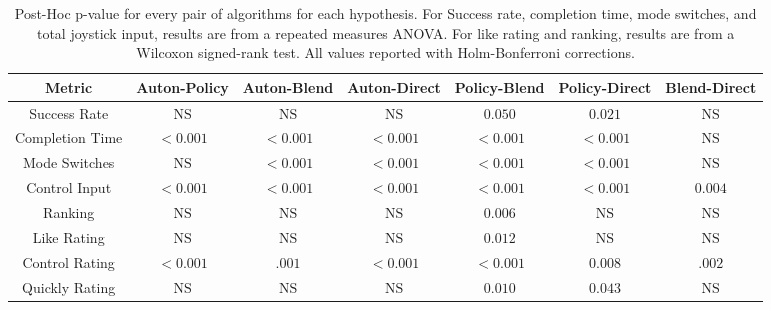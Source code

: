 \begin{table*}
  \newcommand{\algoauton}{Auton}
  \newcommand{\algopolicy}{Policy}
  \newcommand{\algoblend}{Blend}
  \newcommand{\algodirect}{Direct}
  \newcommand{\sigresult}[1]{\bm{#1}}
  \newcommand{\spssnoval}{\sigresult{<\!0.001}}
  \newcommand{\nonsigresult}{\text{NS}}
  \centering
  \begin{tabular}{|c|c|c|c|c|c|c|}
    \hline
    Metric & \algoauton-\algopolicy & \algoauton-\algoblend & \algoauton-\algodirect & \algopolicy-\algoblend & \algopolicy-\algodirect & \algoblend-\algodirect \\
    \hline
    Success Rate & $\nonsigresult$ & $\nonsigresult$ & $\nonsigresult$ & $\sigresult{0.050}$ & $\sigresult{0.021}$ & $\nonsigresult$ \\
    Completion Time & $\spssnoval$ & $\spssnoval$ & $\spssnoval$ & $\spssnoval$ & $\spssnoval$ & $\nonsigresult$ \\
    Mode Switches & $\nonsigresult$ & $\spssnoval$ & $\spssnoval$ & $\spssnoval$ & $\spssnoval$ & $\nonsigresult$ \\
    Control Input & $\spssnoval$ & $\spssnoval$ & $\spssnoval$ & $\spssnoval$ & $\spssnoval$ & $\sigresult{0.004}$ \\
    Ranking & $\nonsigresult$ & $\nonsigresult$ & $\nonsigresult$ & $\sigresult{0.006}$ & $\nonsigresult$ & $\nonsigresult$ \\
    Like Rating& $\nonsigresult$ & $\nonsigresult$ & $\nonsigresult$ & $\sigresult{0.012}$ & $\nonsigresult$ & $\nonsigresult$ \\
    Control Rating& $\spssnoval$ & $\sigresult{.001}$ & $\spssnoval$ & $\spssnoval$ & $\sigresult{0.008}$ & $\sigresult{.002}$ \\
    Quickly Rating& $\nonsigresult$ & $\nonsigresult$ & $\nonsigresult$ & $\sigresult{0.010}$ & $\sigresult{0.043}$ & $\nonsigresult$ \\
    \hline
    \end{tabular} 
    \caption{Post-Hoc p-value for every pair of algorithms for each hypothesis. For Success rate, completion time, mode switches, and total joystick input, results are from a repeated measures ANOVA. For like rating and ranking, results are from a Wilcoxon signed-rank test. All values reported with Holm-Bonferroni corrections.}
    \label{tab:eating_p_val_results}
\end{table*}
